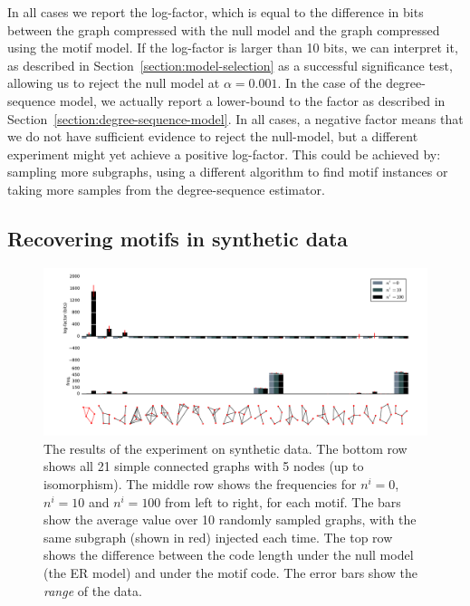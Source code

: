 In all cases we report the log-factor, which is equal to the difference in bits between the graph compressed with the null model and the graph compressed using the motif model. If the log-factor is larger than 10 bits, we can interpret it, as described in Section~\ref{section:model-selection} as a successful significance test, allowing us to reject the null model at $\alpha=0.001$. In the case of the degree-sequence model, we actually report a lower-bound to the factor as described in Section~\ref{section:degree-sequence-model}. In all cases, a negative factor means that we do not have sufficient evidence to reject the null-model, but a different experiment might yet achieve a positive log-factor. This could be achieved by: sampling more subgraphs, using a different algorithm to find motif instances or taking more samples from the degree-sequence estimator.

\subsection{Recovering motifs in synthetic data}

\label{section:recovering}

\begin{figure}[h]
  \hspace{-4cm}
  \includegraphics[width=20cm]{./images/synthetic-plot.pdf}
  \caption{\small The results of the experiment on synthetic data. The bottom row shows all 21 simple connected graphs with 5 nodes (up to isomorphism). The middle row shows the frequencies for $n^i = 0$, $n^i=10$ and $n^i=100$ from left to right, for each motif. The bars show the average value over 10 randomly sampled graphs, with the same subgraph (shown in red) injected each time. The top row shows the difference between  the code length under the null model (the ER model) and under the motif code. The error bars show the \emph{range} of the data.}
  \label{figure:plot-synthetic}
\end{figure}

